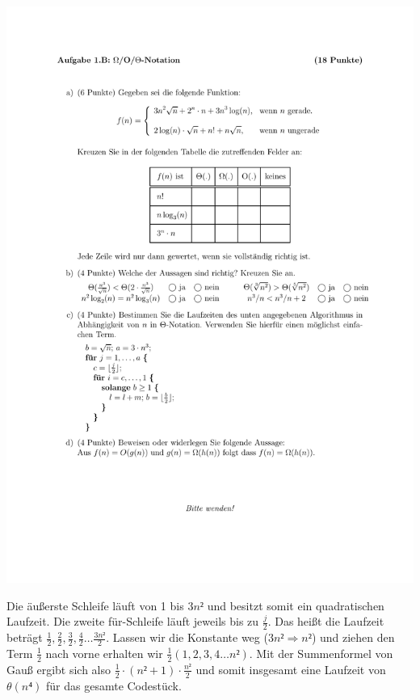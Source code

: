 \documentclass[a4paper, 12pt]{article}
\begin{document}
\begin{minipage}[t]{0.45\textwidth}
    \centering
    \includegraphics{Figures/Test_2007-11-16_1Bc}
    \label{figure:Test_2007-11-16_1Bc}
\end{minipage}

Die äußerste Schleife läuft von 1 bis $3n²$ und besitzt somit ein
quadratischen Laufzeit. Die zweite für-Schleife läuft jeweils bis zu
$\frac{j}{2}$. Das heißt die Laufzeit beträgt
$\frac{1}{2},\frac{2}{2},\frac{3}{2},\frac{4}{2}\dots\frac{3n²}{2}$. Lassen
wir die Konstante weg ($3n² ⇒ n²$) und ziehen den Term $\frac{1}{2}$ nach
vorne erhalten wir $\frac{1}{2}\left(1,2,3,4\dots n²\right)$. Mit der
Summenformel von Gauß ergibt sich also $\frac{1}{2}⋅(n²+1)⋅\frac{n²}{2}$ und
somit insgesamt eine Laufzeit von $θ\left(n⁴\right)$ für das gesamte
Codestück.\\
\end{document}
